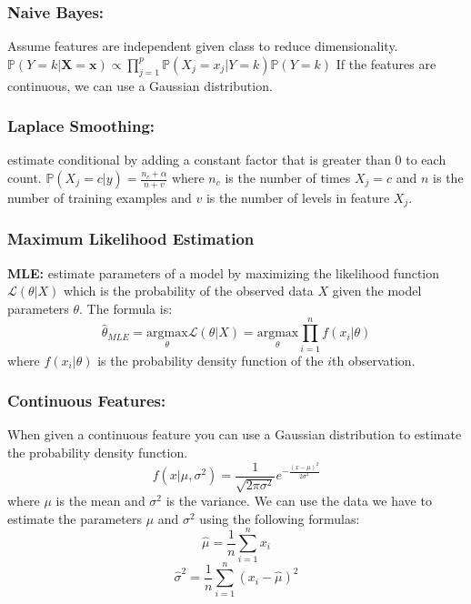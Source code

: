 \subsubsection{Naive Bayes:} Assume features are independent given class to reduce dimensionality. \(\mathbb{P}(Y=k|\mathbf{X}=\mathbf{x})\propto \prod^{p}_{j=1}\mathbb{P}(X_j=x_j|Y=k)\mathbb{P}(Y=k)\)
If the features are continuous, we can use a Gaussian distribution.
\subsubsection{Laplace Smoothing:} estimate conditional by adding a constant factor that is greater than 0 to each count. \(\mathbb{P}(X_j=c|y)=\frac{n_{c}+\alpha}{n+v}\) where $n_c$ is the number of times $X_j=c$ and $n$ is the number of training examples and $v$ is the number of levels in feature $X_j$.
\subsubsection{Maximum Likelihood Estimation} \textbf{MLE:} estimate parameters of a model by maximizing the likelihood function $\mathcal{L}(\theta|X)$ which is the probability of the observed data $X$ given the model parameters $\theta$. The formula is: \[\hat{\theta}_{MLE}=\underset{\theta}{\text{argmax}}\mathcal{L}(\theta|X)=\underset{\theta}{\text{argmax}}\prod_{i=1}^{n}f(x_i|\theta)\] where $f(x_i|\theta)$ is the probability density function of the $i$th observation.
\subsubsection{Continuous Features:} When given a continuous feature you can use a Gaussian distribution to estimate the probability density function. \[f(x|\mu,\sigma^2)=\frac{1}{\sqrt{2\pi\sigma^2}}e^{-\frac{(x-\mu)^2}{2\sigma^2}}\] where $\mu$ is the mean and $\sigma^2$ is the variance. We can use the data we have to estimate the parameters $\mu$ and $\sigma^2$ using the following formulas: \[\hat{\mu}=\frac{1}{n}\sum_{i=1}^{n}x_i\] \[\hat{\sigma}^2=\frac{1}{n}\sum_{i=1}^{n}(x_i-\hat{\mu})^2\]
